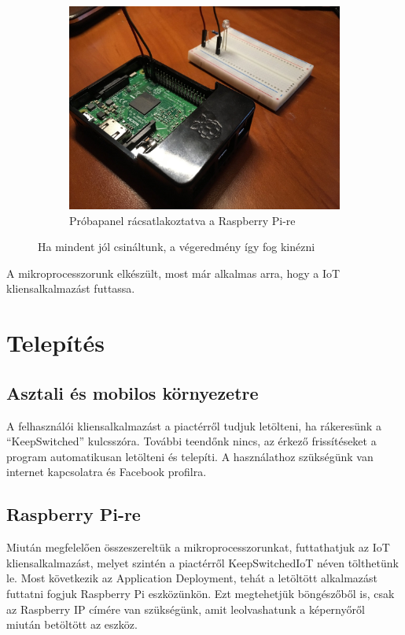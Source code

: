\documentclass[a4paper,12pt]{report}
\begin{document}
\begin{figure}[h!]
\begin{subfigure}[b]{0.5\linewidth}
            \includegraphics[width=\linewidth]{images/osszeszerelt3.jpg}
            \caption{Próbapanel rácsatlakoztatva a Raspberry Pi-re}
        \end{subfigure}
        \caption{Ha mindent jól csináltunk, a végeredmény így fog kinézni}
        \label{fig:összeszerelés}
    \end{figure}

    A mikroprocesszorunk elkészült, most már alkalmas arra, hogy a IoT kliensalkalmazást futtassa.

    \section{Telepítés}

    \subsection{Asztali és mobilos környezetre}
    A felhasználói kliensalkalmazást a piactérről tudjuk letölteni, ha rákeresünk a ``KeepSwitched'' kulcsszóra. További
    teendőnk nincs, az érkező frissítéseket a program automatikusan letölteni és telepíti.
    A használathoz szükségünk van internet kapcsolatra és Facebook profilra.

    \subsection{Raspberry Pi-re}
    Miután megfelelően összeszereltük a mikroprocesszorunkat, futtathatjuk az IoT kliensalkalmazást, melyet szintén a piactérről
    KeepSwitchedIoT néven tölthetünk le.
    Most következik az Application Deployment, tehát a letöltött alkalmazást futtatni fogjuk Raspberry Pi eszközünkön. Ezt
    megtehetjük böngészőből is, csak az Raspberry IP címére van szükségünk, amit leolvashatunk a képernyőről miután betöltött
    az eszköz.
\end{document}
